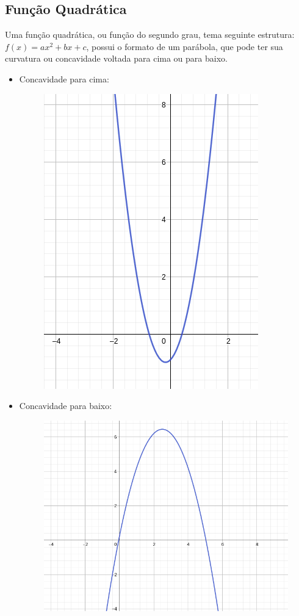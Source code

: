 \begin{multicols*}{2}
             \section*{Função Quadrática}
             Uma função quadrática, ou função do segundo grau, tema seguinte estrutura: $f(x) = ax^2 + bx 			+c$, possui o formato de um parábola, que pode ter sua curvatura ou concavidade voltada para 			cima ou para baixo.
             \begin{itemize}
             \item Concavidade para cima:
             \begin{figure}[H]
                \includegraphics[scale=0.3]{assets/rafael/img16.png}
            \end{figure}
            \item Concavidade para baixo:
            \begin{figure}[H]
                \includegraphics[scale=0.3]{assets/rafael/img17.png}

\end{figure}
\end{itemize}
\end{multicols*}
